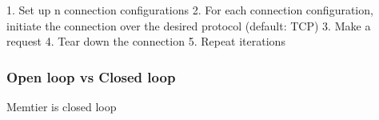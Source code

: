 1. Set up n connection configurations
2. For each connection configuration, initiate the connection over the desired protocol (default: TCP)
3. Make a request
4. Tear down the connection
5. Repeat iterations

\subsubsection{Open loop vs Closed loop}
Memtier is closed loop




